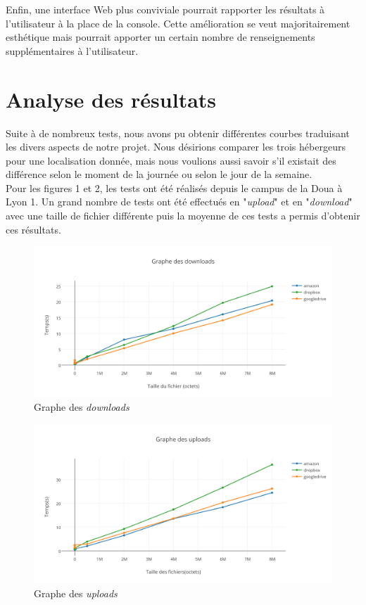 \documentclass[10pt]{article}
\begin{document}
Enfin, une interface Web plus conviviale pourrait rapporter les résultats à l'utilisateur à la place de la console. Cette amélioration se veut majoritairement esthétique mais pourrait apporter un certain nombre de renseignements supplémentaires à l'utilisateur.

\section{Analyse des résultats}

Suite à de nombreux tests, nous avons pu obtenir différentes courbes traduisant les divers aspects de notre projet. Nous désirions comparer les trois hébergeurs pour une localisation donnée, mais nous voulions aussi savoir s'il existait des différence selon le moment de la journée ou selon le jour de la semaine.\\

Pour les figures 1 et 2, les tests ont été réalisés depuis le campus de la Doua à Lyon 1. Un grand nombre de tests ont été effectués en "\textit{upload}" et en "\textit{download}" avec une taille de fichier différente puis la moyenne de ces tests a permis d'obtenir ces résultats.

\begin{figure}[h]
\centering
\includegraphics[scale=0.7]{graphe_des_downloads.png}
\caption{Graphe des \textit{downloads}}
\end{figure}

\newpage

\begin{figure}[h]
\centering
\includegraphics[scale=0.7]{graphe_des_uploads.png}
\caption{Graphe des \textit{uploads}}
\end{figure}
\end{document}
